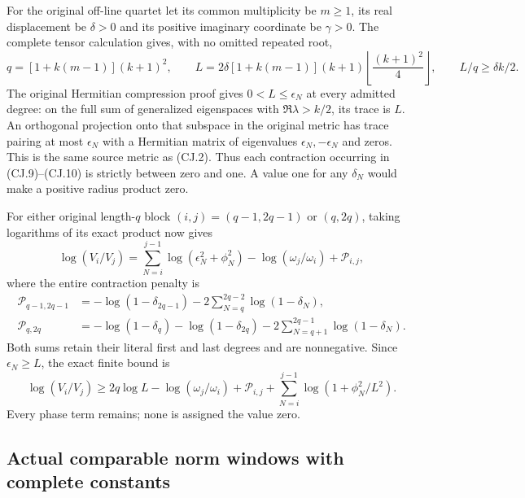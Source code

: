 For the original off-line quartet let its common multiplicity
be $m\ge1$, its real displacement be $\delta>0$ and its
positive imaginary coordinate be $\gamma>0$. The complete
tensor calculation gives, with no omitted repeated root,
\[
 q=[1+k(m-1)](k+1)^2,\qquad
 L=2\delta[1+k(m-1)](k+1)
              \left\lfloor\frac{(k+1)^2}{4}\right\rfloor,
 \qquad L/q\ge\delta k/2.
 \tag{CJ.11}
\]
The original Hermitian compression proof gives
$0<L\le\epsilon_N$ at every admitted degree: on the full
sum of generalized eigenspaces with $\Re\lambda>k/2$, its
trace is $L$. An orthogonal projection onto that subspace in
the original metric has trace pairing at most $\epsilon_N$
with a Hermitian matrix of eigenvalues $\epsilon_N,-\epsilon_N$
and zeros. This is the same source metric as (CJ.2).
Thus each contraction occurring in (CJ.9)--(CJ.10) is strictly
between zero and one. A value one for any $\delta_N$ would
make a positive radius product zero.

For either original length-$q$ block $(i,j)=(q-1,2q-1)$ or
$(q,2q)$, taking logarithms of its exact product now gives
\[
 \log(V_i/V_j)
 =\sum_{N=i}^{j-1}\log(\epsilon_N^2+\phi_N^2)
       -\log(\omega_j/\omega_i)+\mathcal P_{i,j},
 \tag{CJ.12}
\]
where the entire contraction penalty is
\[
 \begin{split}
 \mathcal P_{q-1,2q-1}
 &=-\log(1-\delta_{2q-1})
       -2\sum_{N=q}^{2q-2}\log(1-\delta_N),\\
 \mathcal P_{q,2q}
 &=-\log(1-\delta_q)-\log(1-\delta_{2q})
       -2\sum_{N=q+1}^{2q-1}\log(1-\delta_N).
 \end{split}
 \tag{CJ.13}
\]
Both sums retain their literal first and last degrees and are
nonnegative. Since $\epsilon_N\ge L$, the exact finite bound is
\[
 \log(V_i/V_j)\ge2q\log L-\log(\omega_j/\omega_i)
   +\mathcal P_{i,j}
   +\sum_{N=i}^{j-1}\log(1+\phi_N^2/L^2).
 \tag{CJ.14}
\]
Every phase term remains; none is assigned the value zero.

\subsection{Actual comparable norm windows with complete constants}

